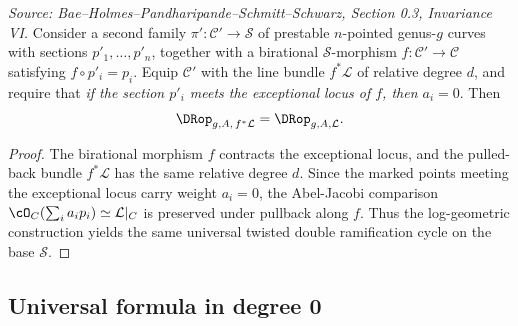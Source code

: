 \begin{lemma}
  \label{lem:invariance_partial_stabilization}
  \textit{Source: Bae--Holmes--Pandharipande--Schmitt--Schwarz, Section 0.3, Invariance VI.}
  Consider a second family $\pi'\colon \mathcal{C}' \to \mathcal{S}$ of prestable
  $n$-pointed genus-$g$ curves with sections $p'_1,\ldots,p'_n$, together with a birational
  $\mathcal{S}$-morphism $f\colon \mathcal{C}' \to \mathcal{C}$ satisfying $f \circ p'_i = p_i$.
  Equip $\mathcal{C}'$ with the line bundle $f^*\mathcal{L}$ of relative degree $d$, and
  require that \emph{if the section $p'_i$ meets the exceptional locus of $f$, then $a_i = 0$}.
  Then
  \[
    \DRop_{g,A,\,f^*\mathcal{L}} = \DRop_{g,A,\mathcal{L}}.
  \]
\end{lemma}

\begin{proof}
  The birational morphism $f$ contracts the exceptional locus, and the pulled-back bundle
  $f^*\mathcal{L}$ has the same relative degree $d$.  Since the marked points meeting the
  exceptional locus carry weight $a_i = 0$, the Abel-Jacobi comparison
  $\cO_C(\sum_i a_i p_i) \simeq \mathcal{L}|_C$ is preserved under pullback along $f$.
  Thus the log-geometric construction yields the same universal twisted double ramification
  cycle on the base $\mathcal{S}$.
\end{proof}

\subsection{Universal formula in degree 0}

